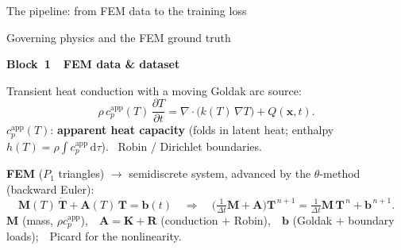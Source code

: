 \documentclass[aspectratio=169,11pt]{beamer}
\newcommand{\dd}{\mathrm{d}}
\newcommand{\grad}{\nabla}
\newcommand{\cpapp}{c_p^{\mathrm{app}}}
\newcommand{\blocktag}[3]{\par\vspace{-3.5mm}\hfill
  {\footnotesize\setlength{\fboxsep}{2.2pt}%
   \colorbox{#1!16}{\textcolor{#1!60!black}{\textbf{Block~#2~\textbullet~#3}}}}%
  \par\vspace{0.3mm}}
\begin{document}
\begin{frame}{The pipeline: from FEM data to the training loss}
  \vfill
  {\centering\small{}\par}
\end{frame}

\begin{frame}{Governing physics and the FEM ground truth}
  \blocktag{green!55!black}{1}{FEM data \& dataset}
  Transient heat conduction with a moving Goldak arc source:
  \begin{equation*}
    \rho\,\cpapp(T)\,\frac{\partial T}{\partial t}
      = \grad\!\cdot\!\big(k(T)\,\grad T\big) + Q(\bm x,t).
  \end{equation*}
  $\cpapp(T)$: \textbf{apparent heat capacity} (folds in latent heat; enthalpy
  $h(T)=\rho\!\int\cpapp\,\dd\tau$). \ Robin / Dirichlet boundaries.
  \pause

  \textbf{FEM} ($P_1$ triangles) $\to$ semidiscrete system, advanced by the
  $\theta$-method (backward Euler):
  \begin{equation*}
    \bm M(T)\,\dot{\bm T}+\bm A(T)\,\bm T=\bm b(t)
    \quad\Longrightarrow\quad
    \Big(\tfrac{1}{\Delta t}\bm M+\bm A\Big)\bm T^{\,n+1}
      =\tfrac{1}{\Delta t}\bm M\,\bm T^{\,n}+\bm b^{\,n+1}.
  \end{equation*}
  \pause
  {\small $\bm M$ (mass, $\rho\cpapp$),\ \ $\bm A=\bm K+\bm R$ (conduction $+$
  Robin),\ \ $\bm b$ (Goldak $+$ boundary loads);\ \ Picard for the
  nonlinearity.}
\end{frame}
\end{document}
